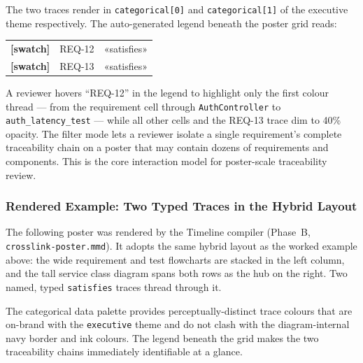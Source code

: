 The two traces render in \texttt{categorical[0]} and \texttt{categorical[1]}
of the executive theme respectively.  The auto-generated legend beneath the
poster grid reads:

\begin{center}\small
\begin{tabular}{lll}
\textbf{[swatch]} & REQ-12 & \textsf{«satisfies»} \\
\textbf{[swatch]} & REQ-13 & \textsf{«satisfies»} \\
\end{tabular}
\end{center}

A reviewer hovers ``REQ-12'' in the legend to highlight only the first
colour thread --- from the requirement cell through \texttt{AuthController} to
\texttt{auth\_latency\_test} --- while all other cells and the REQ-13 trace dim
to 40\%
opacity.  The filter mode lets a reviewer isolate a single requirement's
complete traceability chain on a poster that may contain dozens of requirements
and components.  This is the core interaction model for poster-scale
traceability review.

\subsubsection{Rendered Example: Two Typed Traces in the Hybrid Layout}
\label{sec:cdl-trace-rendered}

The following poster was rendered by the Timeline compiler (Phase~B,
\texttt{crosslink-poster.mmd}).  It adopts the same hybrid layout as the worked
example above: the wide requirement and test flowcharts are stacked in the left
column, and the tall service class diagram spans both rows as the hub on the
right.  Two named, typed \texttt{satisfies} traces thread through it.


\noindent The categorical data palette provides perceptually-distinct trace
colours that are on-brand with the \texttt{executive} theme and do not clash
with the diagram-internal navy border and ink colours.  The legend beneath the
grid makes the two traceability chains immediately identifiable at a glance.

